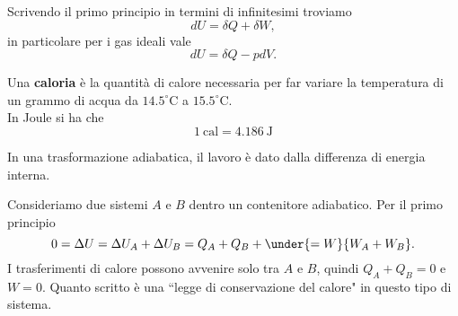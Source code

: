 \begin{remark}
Scrivendo il primo principio in termini di infinitesimi troviamo
\[dU=\delta Q+\delta W,\]
in particolare per i gas ideali vale
\[dU=\delta Q-pdV.\]
\end{remark}


\begin{definition}[Caloria]
Una \textbf{caloria} \`e la quantit\`a di calore necessaria per far variare la temperatura di un grammo di acqua da $14.5^\circ\mathrm{C}$ a $15.5^\circ\mathrm{C}$.\\
In Joule si ha che
\[\boxed{1\ \mathrm{cal}=4.186\ \mathrm{J}}\]
\end{definition}


\begin{remark}
In una trasformazione adiabatica, il lavoro \`e dato dalla differenza di energia interna.
\end{remark}
\begin{example}
Consideriamo due sistemi $A$ e $B$ dentro un contenitore adiabatico. Per il primo principio
\[0=\Delta U=\Delta U_A+\Delta U_B=Q_A+Q_B+\under{=W}{W_A+W_B}.\]
I trasferimenti di calore possono avvenire solo tra $A$ e $B$, quindi $Q_A+Q_B=0$ e $W=0$. Quanto scritto \`e una ``legge di conservazione del calore" in questo tipo di sistema.
\end{example}